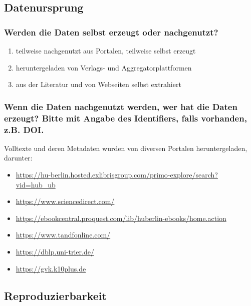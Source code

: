 \documentclass[%
  11pt,
  DIV=16,
  a4paper,
  BCOR=15mm,
  twoside=on,
  bibliography=totoc,
  headings=normal,
  numbers=noendperiod,
]{scrartcl}
\begin{document}
\subsection{Datenursprung}

\subsubsection{Werden die Daten selbst erzeugt oder nachgenutzt?}

\begin{enumerate}[(1)]
  \item
    teilweise nachgenutzt aus Portalen, teilweise selbst erzeugt
  \item
    heruntergeladen von Verlags- und Aggregatorplattformen
  \item
    aus der Literatur und von Webseiten selbst extrahiert
\end{enumerate}

\subsubsection{Wenn die Daten nachgenutzt werden, wer hat die Daten erzeugt? Bitte mit Angabe des Identifiers, falls vorhanden, z.B. DOI.}

Volltexte und deren Metadaten wurden von diversen Portalen heruntergeladen, darunter:
%
\begin{itemize}
  \item
    \url{https://hu-berlin.hosted.exlibrisgroup.com/primo-explore/search?vid=hub_ub}
  \item
    \url{https://www.sciencedirect.com/}
  \item
    \url{https://ebookcentral.proquest.com/lib/huberlin-ebooks/home.action}
  \item
    \url{https://www.tandfonline.com/}
  \item
    \url{https://dblp.uni-trier.de/}
  \item
    \url{https://gvk.k10plus.de}
\end{itemize}

\subsection{Reproduzierbarkeit}

\end{document}
